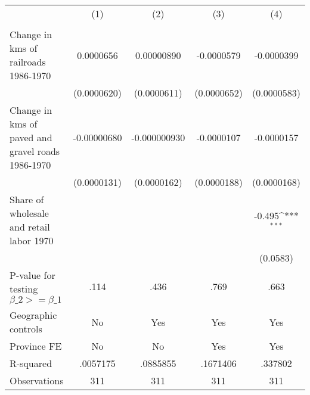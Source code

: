 {
\def\sym#1{\ifmmode^{#1}\else\(^{#1}\)\fi}
\begin{tabular}{l*{4}{c}}
\hline\hline
                &\multicolumn{1}{c}{(1)}&\multicolumn{1}{c}{(2)}&\multicolumn{1}{c}{(3)}&\multicolumn{1}{c}{(4)}\\
                &\multicolumn{1}{c}{}&\multicolumn{1}{c}{}&\multicolumn{1}{c}{}&\multicolumn{1}{c}{}\\
\hline
Change in kms of railroads 1986-1970&0.0000656         &0.00000890         &-0.0000579         &-0.0000399         \\
                &(0.0000620)         &(0.0000611)         &(0.0000652)         &(0.0000583)         \\
[1em]
Change in kms of paved and gravel roads 1986-1970&-0.00000680         &-0.000000930         &-0.0000107         &-0.0000157         \\
                &(0.0000131)         &(0.0000162)         &(0.0000188)         &(0.0000168)         \\
[1em]
Share of wholesale and retail labor 1970&                  &                  &                  &   -0.495\sym{***}\\
                &                  &                  &                  & (0.0583)         \\
\hline
P-value for testing $\beta\_{2} >= \beta\_{1}$&     .114         &     .436         &     .769         &     .663         \\
Geographic controls&       No         &      Yes         &      Yes         &      Yes         \\
Province FE     &       No         &       No         &      Yes         &      Yes         \\
R-squared       & .0057175         & .0885855         & .1671406         &  .337802         \\
Observations    &      311         &      311         &      311         &      311         \\
\hline\hline
\end{tabular}
}
